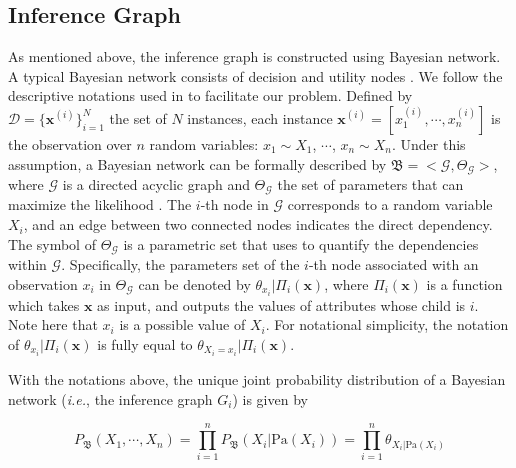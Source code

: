 \subsection{Inference Graph}
As mentioned above, the inference graph is constructed using Bayesian network.
A typical Bayesian network consists of decision and utility nodes \cite{Murphy2001}.
We follow the descriptive notations used in \cite{koller2009probabilistic} to facilitate our problem.
Defined by $\mathcal{D}=\{\mathbf{x}^{(i)}\}_{i=1}^N$ the set of $N$ instances, each instance $\mathbf{x}^{(i)}=[x_1^{(i)}, \cdots, x_n^{(i)}]$ is the observation over $n$ random variables: $x_1\sim X_1$, $\cdots$, $x_n\sim X_n$. 
Under this assumption, a Bayesian network can be formally described by $\mathfrak{B}=<\mathcal{G},\mathit{\Theta}_\mathcal{G}>$, where $\mathcal{G}$ is a directed acyclic graph and $\mathit{\Theta}_\mathcal{G}$ the set of parameters that can maximize the likelihood \cite{friedman1997bayesian, petitjean2018accurate}. 
The $i$-th node in $\mathcal{G}$ corresponds to a random variable ${X}_i$, and an edge between two connected nodes indicates the direct dependency. 
The symbol of $\mathit{\Theta}_\mathcal{G}$ is a parametric set that uses to quantify the dependencies within $\mathcal{G}$. %
Specifically, the parameters set of the $i$-th node associated with an observation $x_i$ in $\mathit{\Theta}_\mathcal{G}$ can be denoted by $\theta_{x_i}|\Pi_i(\mathbf{x})$, where $\Pi_i(\mathbf{x})$ is a function which takes $\mathbf{x}$ as input, and outputs the values of attributes whose child is $i$.
Note here that ${x_i}$ is a possible value of $X_i$.
For notational simplicity, the notation of $\theta_{x_i}|\Pi_i(\mathbf{x})$ is fully equal to $\theta_{X_i=x_i}|\Pi_i(\mathbf{x})$.

With the notations above, the unique joint probability distribution of a Bayesian network (\textit{i.e.}, the inference graph $G_i$) is given by
\vspace{-1ex}

\begin{equation}\label{eq:BNOri}
P_\mathfrak{B}(X_1, \cdots, X_n) = 
\prod_{i=1}^{n} P_\mathfrak{B}(X_i| \text{Pa}{(X_i)})=
\prod_{i=1}^{n} \theta_{X_i | \text{Pa}(X_i)}
\end{equation}
\vspace{-1ex}

